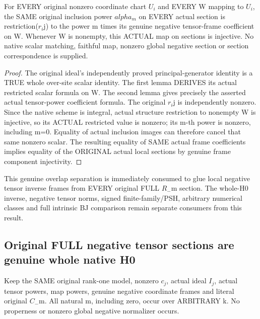 \begin{theorem}
\label{thm:seven-native-negative-subopen-faithfulness}
\leanok
For EVERY original nonzero coordinate chart $U_i$ and EVERY W mapping
to $U_i$, the SAME original inclusion power $alpha_m$ on EVERY actual
section is restriction($r_i$j) to the power m times its genuine negative
tensor-frame coefficient on W. Whenever W is nonempty, this ACTUAL
map on sections is injective. No native scalar matching, faithful map,
nonzero global negative section or section correspondence is supplied.
\end{theorem}
\begin{proof}
The original ideal's independently proved principal-generator identity
is a TRUE whole over-site scalar identity. The first lemma DERIVES its
actual restricted scalar formula on W. The second lemma gives precisely
the asserted actual tensor-power coefficient formula. The original
$r_i$j is independently nonzero. Since the native scheme is integral,
actual structure restriction to nonempty W is injective, so its ACTUAL
restricted value is nonzero; its m-th power is nonzero, including m=0.
Equality of actual inclusion images can therefore cancel that same
nonzero scalar. The resulting equality of SAME actual frame coefficients
implies equality of the ORIGINAL actual local sections by genuine frame
component injectivity.
\end{proof}

This genuine overlap separation is immediately consumed to glue local
negative tensor inverse frames from EVERY original FULL $R_-$m section.
The whole-H0 inverse, negative tensor norms, signed finite-family/PSH,
arbitrary numerical classes and full intrinsic BJ comparison remain
separate consumers from this result.

\subsection{Original FULL negative tensor sections are genuine whole native H0}
Keep the SAME original rank-one model, nonzero $c_j$, actual ideal $I_j$,
actual tensor powers, map powers, genuine negative coordinate frames
and literal original $C_-$m. All natural m, including zero, occur over
ARBITRARY k. No properness or nonzero global negative normalizer occurs.

